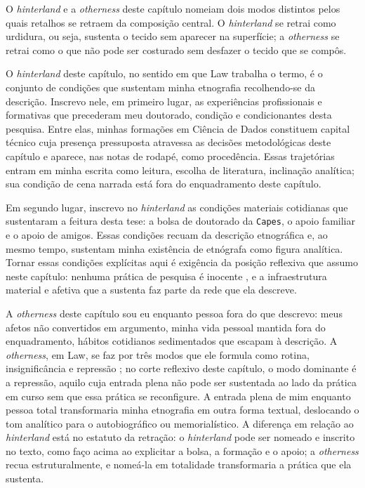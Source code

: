 O \textit{hinterland} e a \textit{otherness} deste capítulo nomeiam dois modos distintos pelos quais retalhos se retraem da composição central. O \textit{hinterland} se retrai como urdidura, ou seja, sustenta o tecido sem aparecer na superfície; a \textit{otherness} se retrai como o que não pode ser costurado sem desfazer o tecido que se compôs.

O \textit{hinterland} deste capítulo, no sentido em que Law trabalha o termo, é o conjunto de condições que sustentam minha etnografia recolhendo-se da descrição. Inscrevo nele, em primeiro lugar, as experiências profissionais e formativas que precederam meu doutorado, condição e condicionantes desta pesquisa. Entre elas, minhas formações em Ciência de Dados constituem capital técnico cuja presença pressuposta atravessa as decisões metodológicas deste capítulo e aparece, nas notas de rodapé, como procedência. Essas trajetórias entram em minha escrita como leitura, escolha de literatura, inclinação analítica; sua condição de cena narrada está fora do enquadramento deste capítulo.

Em segundo lugar, inscrevo no \textit{hinterland} as condições materiais cotidianas que sustentaram a feitura desta tese: a bolsa de doutorado da \texttt{Capes}, o apoio familiar e o apoio de amigos. Essas condições recuam da descrição etnográfica e, ao mesmo tempo, sustentam minha existência de etnógrafa como figura analítica. Tornar essas condições explícitas aqui é exigência da posição reflexiva que assumo neste capítulo: nenhuma prática de pesquisa é inocente \parencite{Haraway2023Ficar}, e a infraestrutura material e afetiva que a sustenta faz parte da rede que ela descreve.

A \textit{otherness} deste capítulo sou eu enquanto pessoa fora do que descrevo: meus afetos não convertidos em argumento, minha vida pessoal mantida fora do enquadramento, hábitos cotidianos sedimentados que escapam à descrição. A \textit{otherness}, em Law, se faz por três modos que ele formula como rotina, insignificância e repressão \parencite[p.~84]{Law2004After}; no corte reflexivo deste capítulo, o modo dominante é a repressão, aquilo cuja entrada plena não pode ser sustentada ao lado da prática em curso sem que essa prática se reconfigure. A entrada plena de mim enquanto pessoa total transformaria minha etnografia em outra forma textual, deslocando o tom analítico para o autobiográfico ou memorialístico. A diferença em relação ao \textit{hinterland} está no estatuto da retração: o \textit{hinterland} pode ser nomeado e inscrito no texto, como faço acima ao explicitar a bolsa, a formação e o apoio; a \textit{otherness} recua estruturalmente, e nomeá-la em totalidade transformaria a prática que ela sustenta.

